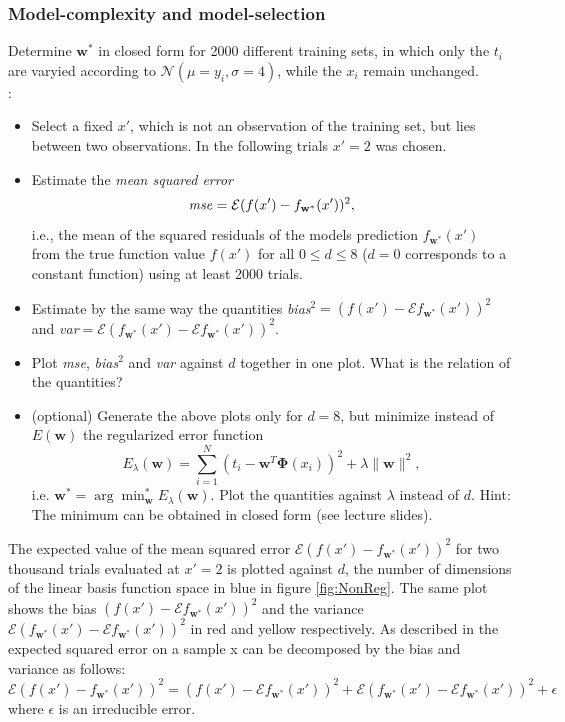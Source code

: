 \documentclass[a4]{article}
\begin{document}
\subsubsection{Model-complexity and model-selection}
Determine ${\mathbf w}^*$ in closed form for 2000 different training sets, in which only the $t_i$ are varyied according to $\mathcal{N}(\mu = y_i,\sigma = 4)$, while the $x_i$ remain unchanged. \\


\vspace{2mm}
:
\begin{itemize}
\item Select a fixed $x'$, which is not an observation of the training set, but lies between two observations. In the following trials $x' = 2$ was chosen.
\item Estimate the \emph{mean squared error} 
\begin{equation} \nonumber
\mbox{\emph{mse}} = \mathcal{E} (f(x')-f_{\mathbf w^*}(x'))^2,
\end{equation}i.e., the mean of the squared residuals of the models prediction $f_{\mathbf w^*}(x')$ from the true function value $f(x')$ for all $0 \leq d \leq 8$ ($d = 0$ corresponds to a constant function) using at least 2000 trials.  
\item Estimate by the same way the quantities \emph{bias}$^2 = (f(x')-\mathcal{E} f_{\mathbf w^*}(x'))^2$ and \emph{var}$ =\mathcal{E} (f_{\mathbf w^*}(x') - \mathcal{E} f_{\mathbf w^*}(x'))^2$.
\item Plot \emph{mse}, \emph{bias}$^2$ and \emph{var} against $d$ together in one plot. What is the relation of the quantities?
\item (optional) Generate the above plots only for $d=8$, but minimize instead of $E({\mathbf w})$ the regularized error function 
\begin{equation}
E_{\lambda}({\mathbf w}) = \sum_{i = 1}^N(t_i - {\mathbf w}^T{\mathbf \Phi}(x_i))^2 + \lambda \|{\mathbf w}\|^2,
\end{equation} 
i.e. ${\mathbf w}^* = \arg\min_{\mathbf w}^* E_{\lambda}({\mathbf w})$. Plot the quantities against $\lambda$ instead of $d$. Hint: The minimum can be obtained in closed form (see lecture slides). 
\end{itemize}


The expected value of the mean squared error $\mathcal{E} (f(x')-f_{\mathbf w^*}(x'))^2$ for two thousand trials evaluated at $x'=2$ is plotted against $d$, the number of dimensions of the linear basis function space in blue in figure \ref{fig:NonReg}. The same plot shows the bias $ (f(x')-\mathcal{E} f_{\mathbf w^*}(x'))^2$ and the variance $\mathcal{E} (f_{\mathbf w^*}(x') - \mathcal{E} f_{\mathbf w^*}(x'))^2$ in red and yellow respectively.
As described in \cite{hastie} the expected squared error on a sample x can be decomposed by the bias and variance as follows:
$$\mathcal{E} (f(x')-f_{\mathbf w^*}(x'))^2=(f(x')-\mathcal{E} f_{\mathbf w^*}(x'))^2+\mathcal{E} (f_{\mathbf w^*}(x') - \mathcal{E} f_{\mathbf w^*}(x'))^2 +\epsilon$$
where $\epsilon$ is an irreducible error.\\
\end{document}
